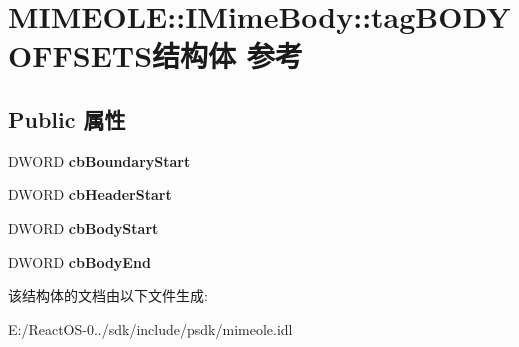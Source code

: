 \hypertarget{struct_m_i_m_e_o_l_e_1_1_i_mime_body_1_1tag_b_o_d_y_o_f_f_s_e_t_s}{}\section{M\+I\+M\+E\+O\+LE\+:\+:I\+Mime\+Body\+:\+:tag\+B\+O\+D\+Y\+O\+F\+F\+S\+E\+T\+S结构体 参考}
\label{struct_m_i_m_e_o_l_e_1_1_i_mime_body_1_1tag_b_o_d_y_o_f_f_s_e_t_s}
\subsection*{Public 属性}
\begin{DoxyCompactItemize}
\item 
\mbox{\label{struct_m_i_m_e_o_l_e_1_1_i_mime_body_1_1tag_b_o_d_y_o_f_f_s_e_t_s_abbe4da0c4ee0036637452776bd8331f7}} 
D\+W\+O\+RD {\bfseries cb\+Boundary\+Start}
\item 
\mbox{\label{struct_m_i_m_e_o_l_e_1_1_i_mime_body_1_1tag_b_o_d_y_o_f_f_s_e_t_s_ab70a1d151e7944de31582ee989c263df}} 
D\+W\+O\+RD {\bfseries cb\+Header\+Start}
\item 
\mbox{\label{struct_m_i_m_e_o_l_e_1_1_i_mime_body_1_1tag_b_o_d_y_o_f_f_s_e_t_s_addf066e9910d2f879e3bee2ae7e8fcb0}} 
D\+W\+O\+RD {\bfseries cb\+Body\+Start}
\item 
\mbox{\label{struct_m_i_m_e_o_l_e_1_1_i_mime_body_1_1tag_b_o_d_y_o_f_f_s_e_t_s_a6c53dc5f58d54797b1543d133ab9b87d}} 
D\+W\+O\+RD {\bfseries cb\+Body\+End}
\end{DoxyCompactItemize}


该结构体的文档由以下文件生成\+:\begin{DoxyCompactItemize}
\item 
E\+:/\+React\+O\+S-\/0../sdk/include/psdk/mimeole.\+idl\end{DoxyCompactItemize}
